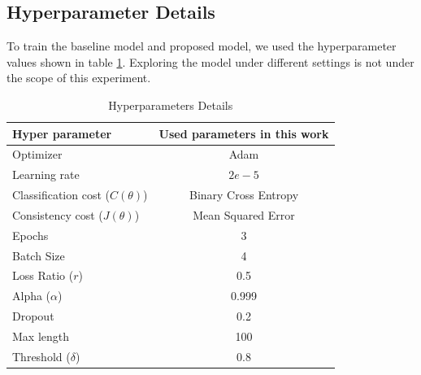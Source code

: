 \documentclass[%
	BCOR=8mm, %
	DIV=12,
	toc=bibliography, %
	toc=listof, %
	oneside, %
	egregdoesnotlikesansseriftitles, %
	]{scrbook}
\begin{document}
\subsection{Hyperparameter Details}
\label{subsection:hyperparameter}
To train the baseline model and proposed model, we used the hyperparameter values shown in table \ref{table:HyperparameterTable}. Exploring the model under different settings is not under the scope of this experiment. 
\begin{table}[H]
\centering
\begin{tabular}{ l c | c | }
\hline
Hyper parameter 		& \multicolumn{2}{c}{Used parameters in this work}\\
\hline
Optimizer 				& \multicolumn{2}{c}{Adam} \\
Learning rate 			& \multicolumn{2}{c}{ $2e - 5$ } \\
Classification cost ($C(\theta)$) 		& \multicolumn{2}{c}{Binary Cross Entropy}  \\
Consistency cost ($J(\theta)$) 	& \multicolumn{2}{c}{Mean Squared Error}  \\
Epochs 				& \multicolumn{2}{c}{$3$} \\
Batch Size 			& \multicolumn{2}{c}{4 } \\
Loss Ratio ($r$)			&\multicolumn{2}{c}{0.5}\\
Alpha ($\alpha$)			&\multicolumn{2}{c}{0.999}\\
Dropout  			& \multicolumn{2}{c}{0.2}  \\
Max length 			 & \multicolumn{2}{c}{100}  \\
Threshold ($\delta$) & \multicolumn{2}{c}{ $0.8$ }\\
\hline
\end{tabular}
\caption[Details of hyperparameters details]{Hyperparameters Details}
\label{table:HyperparameterTable}
\end{table}
\end{document}
